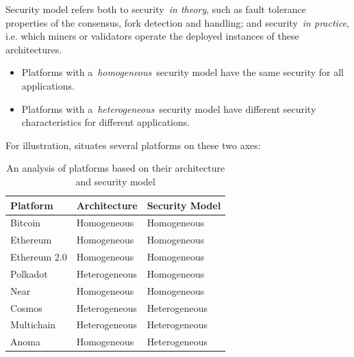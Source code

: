 \documentclass[
    9pt,            %
    commun,        %
    affiltop,       %
]{art}
\begin{document}
Security model refers both to security~\emph{in theory}, such as fault
tolerance properties of the consensus, fork detection and handling; and
security~\emph{in practice}, i.e. which miners or validators operate the
deployed instances of these architectures.

\begin{itemize}

\item
  Platforms with a~\emph{homogeneous}~security model have the same
  security for all applications.
\item
  Platforms with a~\emph{heterogeneous}~security model have different
  security characteristics for different applications.
\end{itemize}

For illustration,  situates several platforms on these
two axes:

\begin{table}[H] 
  \label{tab:platforms}
\centering
\begin{tabular}{lll}
\toprule 
\textbf{Platform} & \textbf{Architecture} & \textbf{Security Model}\\
\midrule 
Bitcoin & Homogeneous & Homogeneous\\
Ethereum & Homogeneous & Homogeneous\\
Ethereum 2.0 & Homogeneous & Homogeneous\\
Polkadot & Heterogeneous & Homogeneous\\
Near & Homogeneous & Homogeneous \\
Cosmos & Heterogeneous & Heterogeneous\\
Multichain & Heterogeneous & Heterogeneous\\
Anoma & Homogeneous & Heterogeneous\\
\bottomrule
\end{tabular} 
\caption{An analysis of platforms based on their architecture and security model}
\end{table}

  
\end{document}

